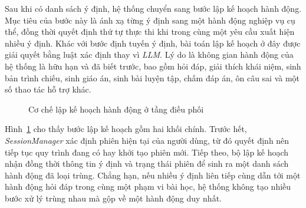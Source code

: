 \documentclass[../DoAn.tex]{subfiles}
\begin{document}
Sau khi có danh sách ý định, hệ thống chuyển sang bước lập kế hoạch hành động. Mục tiêu của bước này là ánh xạ từng ý định sang một hành động nghiệp vụ cụ thể, đồng thời quyết định thứ tự thực thi khi trong cùng một yêu cầu xuất hiện nhiều ý định. Khác với bước định tuyến ý định, bài toán lập kế hoạch ở đây được giải quyết bằng luật xác định thay vì \textit{LLM}. Lý do là không gian hành động của hệ thống là hữu hạn và đã biết trước, bao gồm hỏi đáp, giải thích khái niệm, sinh bản trình chiếu, sinh giáo án, sinh bài luyện tập, chấm đáp án, ôn câu sai và một số thao tác hỗ trợ khác.

\begin{figure}[!htbp]
    \centering
    \caption{Cơ chế lập kế hoạch hành động ở tầng điều phối}
    \label{fig:method-action-planning}
\end{figure}

Hình~\ref{fig:method-action-planning} cho thấy bước lập kế hoạch gồm hai khối chính. Trước hết, \textit{SessionManager} xác định phiên hiện tại của người dùng, từ đó quyết định nên tiếp tục quy trình đang có hay khởi tạo phiên mới. Tiếp theo, bộ lập kế hoạch nhận đồng thời thông tin ý định và trạng thái phiên để sinh ra một danh sách hành động đã loại trùng. Chẳng hạn, nếu nhiều ý định liên tiếp cùng dẫn tới một hành động hỏi đáp trong cùng một phạm vi bài học, hệ thống không tạo nhiều bước xử lý trùng nhau mà gộp về một hành động duy nhất.
\end{document}
